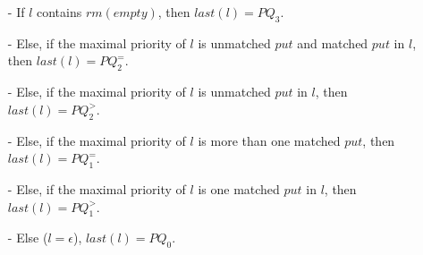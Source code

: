 \begin{itemize}
\setlength{\itemsep}{0.5pt}
\item[-] If $l$ contains $\textit{rm}(\textit{empty})$, then $\textit{last}(l) = \textit{PQ}_3$.

\item[-] Else, if the maximal priority of $l$ is unmatched $\textit{put}$ and matched $\textit{put}$ in $l$, then $\textit{last}(l) = \textit{PQ}_2^{=}$.

\item[-] Else, if the maximal priority of $l$ is unmatched $\textit{put}$ in $l$, then $\textit{last}(l) = \textit{PQ}_2^{>}$.

\item[-] Else, if the maximal priority of $l$ is more than one matched $\textit{put}$, then $\textit{last}(l) = \textit{PQ}_1^{=}$.

\item[-] Else, if the maximal priority of $l$ is one matched $\textit{put}$ in $l$, then $\textit{last}(l) = \textit{PQ}_1^{>}$.

\item[-] Else ($l = \epsilon$), $\textit{last}(l) = \textit{PQ}_0$.
\end{itemize}